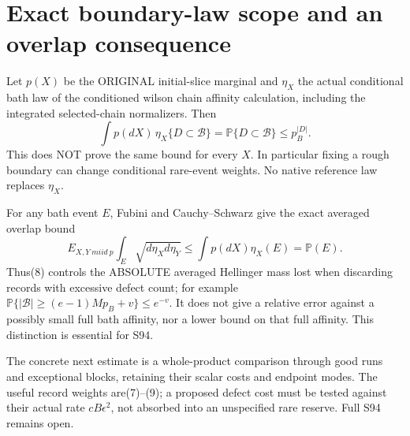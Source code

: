 \documentclass{article}
\begin{document}
\section*{Exact boundary-law scope and an overlap consequence}
Let $p(X)$ be the ORIGINAL initial-slice marginal and $\eta_X$ the actual conditional bath law of the conditioned wilson chain affinity calculation, including the integrated selected-chain normalizers. Then
\[
 \int p(dX)\,\eta_X\{D\subset\mathcal B\}
 =\mathbb P\{D\subset\mathcal B\}\le p_B^{|D|}.        \tag{9}
\]
This does NOT prove the same bound for every $X$. In particular fixing a rough boundary can change conditional rare-event weights. No native reference law replaces $\eta_X$.

For any bath event $E$, Fubini and Cauchy--Schwarz give the exact averaged overlap bound
\[
 E_{X,Y\ {
m iid}\ p}\int_E\sqrt{d\eta_Xd\eta_Y}
 \le\int p(dX)\eta_X(E)=\mathbb P(E).                \tag{10}
\]
Thus(8) controls the ABSOLUTE averaged Hellinger mass lost when discarding records with excessive defect count; for example $\mathbb P\{|\mathcal B|\ge (e-1)Mp_B+v\}\le e^{-v}$. It does not give a relative error against a possibly small full bath affinity, nor a lower bound on that full affinity. This distinction is essential for S94.

The concrete next estimate is a whole-product comparison through good runs and exceptional blocks, retaining their scalar costs and endpoint modes. The useful record weights are(7)--(9); a proposed defect cost must be tested against their actual rate $cB\epsilon^2$, not absorbed into an unspecified rare reserve. Full S94 remains open.
\end{document}
